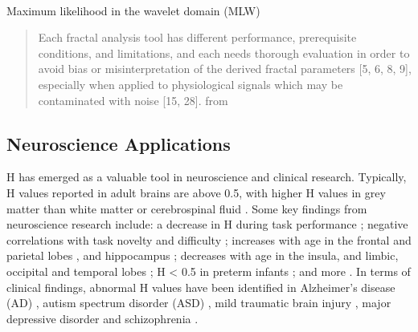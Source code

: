 \documentclass[
  sn-vancouver,
  Numbered,
  referee,
  lineno]{sn-jnl}
\makeatletter
\let\oldparagraph\paragraph
\renewcommand{\paragraph}{
    \@ifstar
      \xxxParagraphStar
      \xxxParagraphNoStar
  }
\newcommand{\xxxParagraphStar}[1]{\oldparagraph*{#1}\mbox{}}
\newcommand{\xxxParagraphNoStar}[1]{\oldparagraph{#1}\mbox{}}
\makeatother
\begin{document}
\paragraph{Maximum likelihood in the wavelet domain
(MLW)}\label{maximum-likelihood-in-the-wavelet-domain-mlw}

\begin{quote}
Each fractal analysis tool has different performance, prerequisite
conditions, and limitations, and each needs thorough evaluation in order
to avoid bias or misinterpretation of the derived fractal parameters
{[}5, 6, 8, 9{]}, especially when applied to physiological signals which
may be contaminated with noise {[}15, 28{]}. from
\citep{ekePhysiologicalTimeSeries2000}
\end{quote}

\subsection{Neuroscience Applications}\label{neuroscience-applications}

H has emerged as a valuable tool in neuroscience and clinical research.
Typically, H values reported in adult brains are above 0.5, with higher
H values in grey matter than white matter or cerebrospinal fluid
\citep{dongHurstExponentAnalysis2018, winkMonofractalMultifractalDynamics2008}.
Some key findings from neuroscience research include: a decrease in H
during task performance
\citep{ciuciuInterplayFunctionalConnectivity2014, heScaleFreePropertiesFunctional2011};
negative correlations with task novelty and difficulty
\citep{churchillSuppressionScalefreeFMRI2016}; increases with age in the
frontal and parietal lobes \citep{dongHurstExponentAnalysis2018}, and
hippocampus \citep{winkAgeCholinergicEffects2006}; decreases with age in
the insula, and limbic, occipital and temporal lobes
\citep{dongHurstExponentAnalysis2018}; H \textless{} 0.5 in preterm
infants \citep{mellaTemporalComplexityBOLDsignal2024}; and more
\citep{campbellMonofractalAnalysisFunctional2022}. In terms of clinical
findings, abnormal H values have been identified in Alzheimer's disease
(AD)
\citep{maximFractionalGaussianNoise2005, warsiCorrelatingBrainBlood2012},
autism spectrum disorder (ASD)
\citep{donaTemporalFractalAnalysis2017, laiShiftRandomnessBrain2010, linkeAlteredDevelopmentHurst2024, uscatescuUsingExcitationInhibition2022},
mild traumatic brain injury \citep{donaFractalAnalysisBrain2017}, major
depressive disorder
\citep{weiIdentifyingMajorDepressive2013, jingIdentifyingCurrentRemitted2017}
and schizophrenia
\citep{sokunbiNonlinearComplexityAnalysis2014, uscatescuUsingExcitationInhibition2022}.
\end{document}
